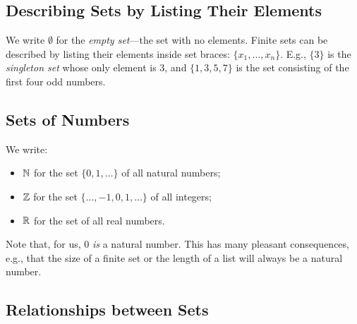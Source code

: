 \subsection{Describing Sets by Listing Their Elements}

We write $\emptyset$
%
%
%
%
for the \emph{empty set}---the set with no elements.  Finite sets can
be described by listing their elements inside set braces: $\{x_1,
\ldots, x_n\}$.
%
%
E.g., $\{3\}$ is the \emph{singleton set}
%
%
whose only element is $3$, and $\{1, 3, 5, 7\}$ is the set consisting
of the first four odd numbers.

\subsection{Sets of Numbers}

We write:
\begin{itemize}
\item $\mathbb{N}$
%
for the set $\{0, 1, \ldots\}$ of all natural numbers;
%

\item $\mathbb{Z}$
%
for the set $\{\ldots, -1, 0, 1, \ldots\}$ of all integers;
%

\item $\mathbb{R}$
%
for the set of all real numbers.
%
\end{itemize}
Note that, for us, $0$ \emph{is} a natural number.  This has many
pleasant consequences, e.g., that the size of a finite set or
the length of a list will always be a natural number.

\subsection{Relationships between Sets}

